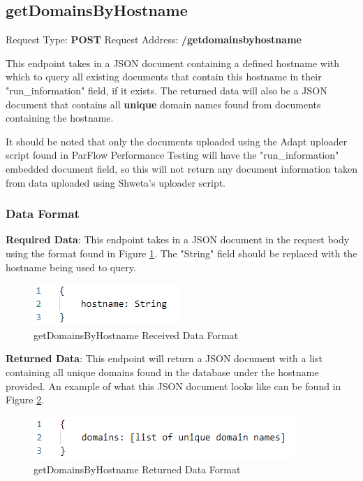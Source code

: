 \subsection{getDomainsByHostname}
Request Type: \textbf{POST}
\newline
Request Address: \textbf{/getdomainsbyhostname}
\newline

This endpoint takes in a JSON document containing a defined hostname with which to query all existing documents that contain this hostname in their "run\_information" field, if it exists. The returned data will also be a JSON document that contains all \textbf{unique} domain names found from documents containing the hostname.

It should be noted that only the documents uploaded using the Adapt uploader script found in ParFlow Performance Testing will have the "run\_information" embedded document field, so this will not return any document information taken from data uploaded using Shweta's uploader script.

\subsubsection{Data Format}
\textbf{Required Data}:
\newline
\newline
This endpoint takes in a JSON document in the request body using the format found in Figure \ref{fig:getdomainsbyhostname}. The "String" field should be replaced with the hostname being used to query.
\begin{figure}[h!]
    \centering
    \includegraphics{img/getdomainsbyhostname.PNG}
    \caption{getDomainsByHostname Received Data Format}
    \label{fig:getdomainsbyhostname}
\end{figure}
\newline
\textbf{Returned Data}:
\newline
\newline
This endpoint will return a JSON document with a list containing all unique domains found in the database under the hostname provided. An example of what this JSON document looks like can be found in Figure \ref{fig:getdomainsbyhostname2}.

\begin{figure}[H]
    \centering
    \includegraphics{img/getdomainsbyhostname2.PNG}
    \caption{getDomainsByHostname Returned Data Format}
    \label{fig:getdomainsbyhostname2}
\end{figure}

